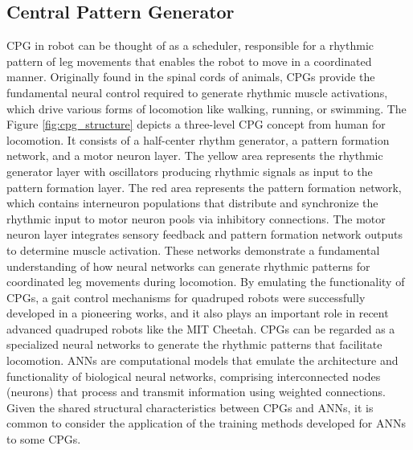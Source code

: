 \subsection{Central Pattern Generator}
\ac{CPG} in robot can be thought of as a scheduler, responsible for a rhythmic pattern of leg movements that enables the robot to move in a coordinated manner. Originally found in the spinal cords of animals, \ac{CPG}s provide the fundamental neural control required to generate rhythmic muscle activations, which drive various forms of locomotion like walking, running, or swimming. The Figure \ref{fig:cpg_structure} depicts a three-level \ac{CPG} concept from human for locomotion. It consists of a half-center rhythm generator, a pattern formation network, and a motor neuron layer. The yellow area represents the rhythmic generator layer with oscillators producing rhythmic signals as input to the pattern formation layer. The red area represents the pattern formation network, which contains interneuron populations that distribute and synchronize the rhythmic input to motor neuron pools via inhibitory connections. The motor neuron layer integrates sensory feedback and pattern formation network outputs to determine muscle activation. These networks demonstrate a fundamental understanding of how neural networks can generate rhythmic patterns for coordinated leg movements during locomotion. By emulating the functionality of \ac{CPG}s, a gait control mechanisms for quadruped robots were successfully developed in a pioneering works\cite{sprowitzDynamicTrotGait2013}, and it also plays an important role in recent advanced quadruped robots like the MIT Cheetah\cite{dicarloDynamicLocomotionMIT2018}. \ac{CPG}s can be regarded as a specialized neural networks to generate the rhythmic patterns that facilitate locomotion. \ac{ANN}s are computational models that emulate the architecture and functionality of biological neural networks, comprising interconnected nodes (neurons) that process and transmit information using weighted connections. Given the shared structural characteristics between \ac{CPG}s and \ac{ANN}s, it is common to consider the application of the training methods developed for \ac{ANN}s to some \ac{CPG}s. 
  

